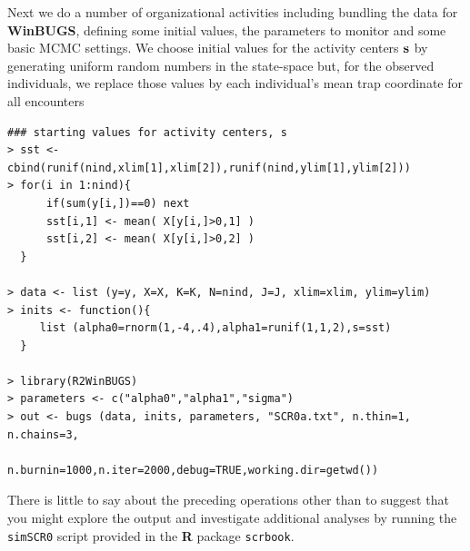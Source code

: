 Next we do a number of organizational activities including bundling
the data for {\bf WinBUGS}, defining some initial values, the parameters to
monitor and some basic MCMC settings.  We choose initial values for
the activity centers ${\bf s}$ by generating uniform random numbers in
the state-space but, for the observed individuals, we replace those
values by each individual's mean trap coordinate for all encounters
{\small
\begin{verbatim}
### starting values for activity centers, s
> sst <- cbind(runif(nind,xlim[1],xlim[2]),runif(nind,ylim[1],ylim[2]))
> for(i in 1:nind){
      if(sum(y[i,])==0) next
      sst[i,1] <- mean( X[y[i,]>0,1] )
      sst[i,2] <- mean( X[y[i,]>0,2] )
  }

> data <- list (y=y, X=X, K=K, N=nind, J=J, xlim=xlim, ylim=ylim)
> inits <- function(){
     list (alpha0=rnorm(1,-4,.4),alpha1=runif(1,1,2),s=sst)
  }

> library(R2WinBUGS)
> parameters <- c("alpha0","alpha1","sigma")
> out <- bugs (data, inits, parameters, "SCR0a.txt", n.thin=1, n.chains=3,
              n.burnin=1000,n.iter=2000,debug=TRUE,working.dir=getwd())
\end{verbatim}
}
There is little to say about the preceding operations other than to
suggest that you might explore the output and investigate additional
analyses by running the \mbox{\tt simSCR0} script provided in the
{\bf R} package \mbox{\tt scrbook}.

